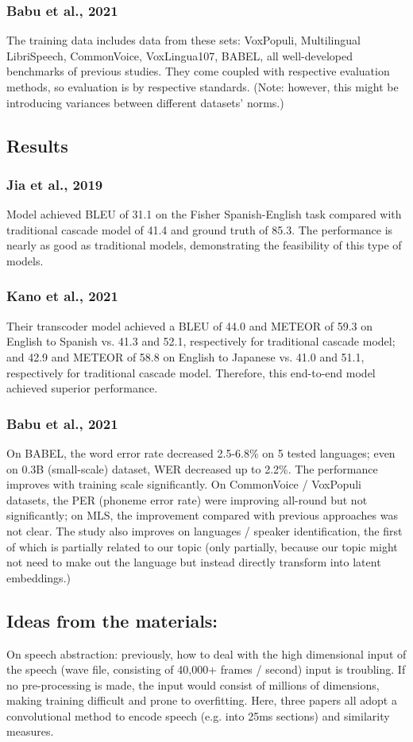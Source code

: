 \documentclass{article}
\begin{document}
\subsubsection{Babu et al., 2021}
The training data includes data from these sets: VoxPopuli, Multilingual LibriSpeech, CommonVoice, VoxLingua107, BABEL, all well-developed benchmarks of previous studies. They come coupled with respective evaluation methods, so evaluation is by respective standards. (Note: however, this might be introducing variances between different datasets’ norms.)
\subsection{Results}
\subsubsection{Jia et al., 2019}
Model achieved BLEU of 31.1 on the Fisher Spanish-English task compared with traditional cascade model of 41.4 and ground truth of 85.3. The performance is nearly as good as traditional models, demonstrating the feasibility of this type of models.
\subsubsection{Kano et al., 2021}
Their transcoder model achieved a BLEU of 44.0 and METEOR of 59.3 on English to Spanish vs. 41.3 and 52.1, respectively for traditional cascade model; and 42.9  and METEOR of 58.8 on English to Japanese vs. 41.0 and 51.1, respectively for traditional cascade model. Therefore, this end-to-end model achieved superior performance.
\subsubsection{Babu et al., 2021}
On BABEL, the word error rate decreased 2.5-6.8\% on 5 tested languages; even on 0.3B (small-scale) dataset, WER decreased up to 2.2\%. The performance improves with training scale significantly. On CommonVoice / VoxPopuli datasets, the PER (phoneme error rate) were improving all-round but not significantly; on MLS, the improvement compared with previous approaches was not clear. The study also improves on languages / speaker identification, the first of which is partially related to our topic (only partially, because our topic might not need to make out the language but instead directly transform into latent embeddings.)

\subsection{Ideas from the materials:}
On speech abstraction: previously, how to deal with the high dimensional input of the speech (wave file, consisting of 40,000+ frames / second) input is troubling. If no pre-processing is made, the input would consist of millions of dimensions, making training difficult and prone to overfitting. Here, three papers all adopt a convolutional method to encode speech (e.g. into 25ms sections) and similarity measures.\\
\end{document}
